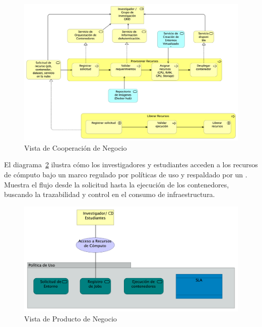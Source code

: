 \begin{figure}[H]
    \centering
    \includegraphics[width=\textwidth]{tablas-images/cp6/Business-Cooperation-View.png}
    \caption{Vista de Cooperación de Negocio}\label{fig:vista-cooperacion-negocio}
\end{figure}
\noindent
El diagrama~\ref{fig:vista-productos-negocio} ilustra cómo los investigadores y estudiantes acceden a los recursos de cómputo bajo un marco regulado por políticas de uso y respaldado por un \SLA. Muestra el flujo desde la solicitud hasta la ejecución de los contenedores, buscando la trazabilidad y control en el consumo de infraestructura.

\begin{figure}[H]
    \centering
    \includegraphics[width=\textwidth]{tablas-images/cp6/Business-Product-View.png}
    \caption{Vista de Producto de Negocio}\label{fig:vista-productos-negocio}
\end{figure}


